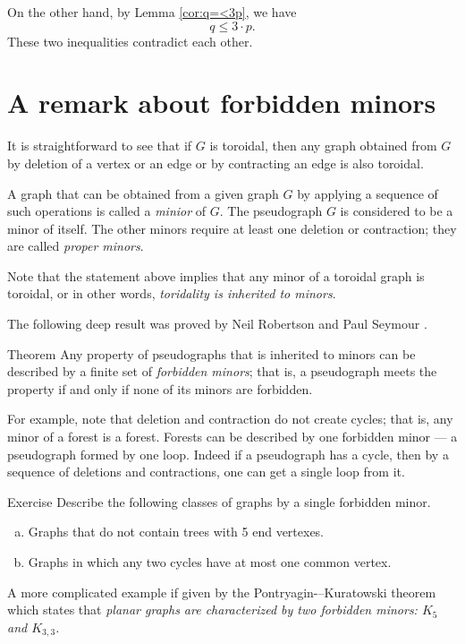 On the other hand, by Lemma \ref{cor:q=<3p}, we have
\[q\le 3\cdot p.\]
These two inequalities contradict each other.
 \qeds

\section*{A remark about forbidden minors}

It is straightforward to see that if $G$ is toroidal, then any graph obtained from $G$ by deletion of a vertex or an edge or by contracting an edge is also toroidal.

A graph that can be obtained from a given graph $G$ by applying a sequence of such operations is called a \emph{minior} of $G$.
The pseudograph $G$ is considered to be a minor of itself.
The other minors require at least one deletion or contraction; they are called \emph{proper minors}.

Note that the statement above implies that any minor of a toroidal graph is toroidal, or in other words, {}\emph{toridality is inherited to minors}.

The following deep result was proved by Neil Robertson and Paul Seymour \cite{robertson-seymour}.

\begin{thm}{Theorem}
Any property of pseudographs that is inherited to minors can be 
described by a finite set of \emph{forbidden minors};
that is,  a pseudograph meets the property if and only if none of its minors are forbidden.
\end{thm}

For example, note that deletion and contraction do not create cycles;
that is, any minor of a forest is a forest.
Forests can be described by one forbidden minor --- a pseudograph formed by one loop.
Indeed if a pseudograph has a cycle, then by a sequence of deletions and contractions, one can get a single loop from it.

\begin{thm}{Exercise}
Describe the following classes of graphs by a single forbidden minor.
\begin{enumerate}[(a)]
 \item Graphs that do not contain trees with 5 end vertexes.
 \item Graphs in which any two cycles have at most one common vertex.
\end{enumerate}
\end{thm}

A more complicated example if given by the Pontryagin-–Kuratowski theorem which states that \emph{planar graphs are characterized by two forbidden minors: $K_5$ and $K_{3,3}$.}

